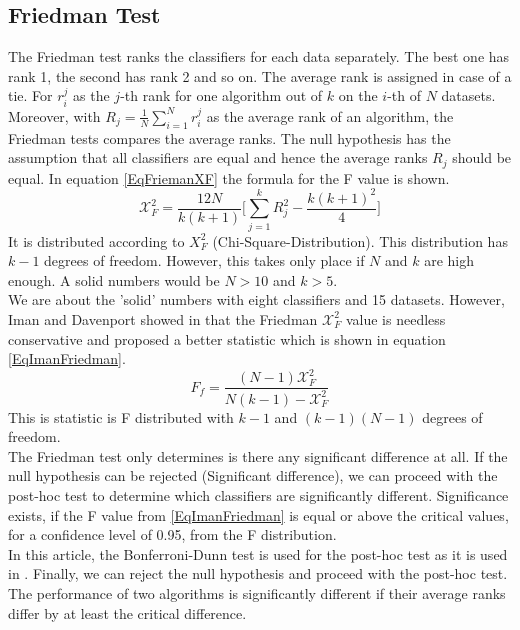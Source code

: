 \subsection{Friedman Test}
The Friedman test ranks the classifiers for each data separately. The best one has rank 1, the second has rank 2 and so on.
The average rank is assigned in case of a tie. For $r_i^j$ as the $j$-th rank for one algorithm out of $k$ on the $i$-th of $N$ datasets.
Moreover, with $R_j = \frac{1}{N}\sum_{i=1}^{N}r_i^j$ as the average rank of an algorithm, the Friedman tests compares the average ranks.
The null hypothesis has the assumption that all classifiers are equal and hence the average ranks $R_j$ should be equal.
In equation \eqref{EqFriemanXF} the formula for the F value is shown.
\begin{equation}\label{EqFriemanXF}
	\mathcal{X}_F^2 = \frac{12N}{k(k+1)}\Bigg[\sum_{j=1}^{k}R_j^2 - \frac{k(k+1)^2}{4} \Bigg]
\end{equation}
It is distributed according to $X_F^2$ (Chi-Square-Distribution).
This distribution has $k-1$ degrees of freedom. However, this takes only place if $N$ and $k$ are high enough.
A solid numbers would be $N>10$ and $k>5$. \cite[p. 11]{JanezDemsar.2006}\\ We are about the 'solid' numbers with eight classifiers and 15 datasets.
However, Iman and Davenport showed in \cite{RonaldL.Iman.} that the Friedman $\mathcal{X}_F^2$ value is needless conservative and proposed a better statistic which is shown in equation \eqref{EqImanFriedman}.\cite[p. 11]{JanezDemsar.2006}
\begin{equation}\label{EqImanFriedman}
	F_f= \frac{(N-1)\mathcal{X}_F^2}{N(k-1)-\mathcal{X}_F^2}
\end{equation}
This is statistic is F distributed with $k-1$ and $(k-1)(N-1)$ degrees of freedom.\\
The Friedman test only determines is there any significant difference at all. 
If the null hypothesis can be rejected (Significant difference), we can proceed with the post-hoc test to determine which classifiers are significantly different.
Significance exists, if the F value from \eqref{EqImanFriedman} is equal or above the critical values, for a confidence level of 0.95, from the F distribution.\cite[p.11]{JanezDemsar.2006}\\
In this article, the Bonferroni-Dunn test is used for the post-hoc test as it is used in \cite{Chen.2009}.
Finally, we can reject the null hypothesis and proceed with the post-hoc test.
The performance of two algorithms is significantly different if their average ranks differ by at least the critical difference. 

